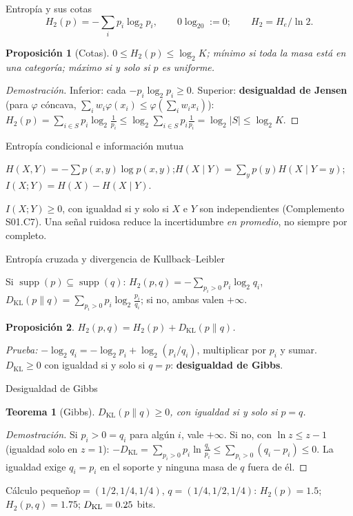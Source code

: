 \documentclass[aspectratio=169,10pt]{beamer}
\newtheorem{proposicion}{Proposición}
\newtheorem{teorema}{Teorema}
\begin{document}
\begin{frame}{Entropía y sus cotas}
\[H_2(p)=-\sum_ip_i\log_2p_i,\qquad 0\log_20:=0;\qquad H_2=H_e/\ln2.\]
\begin{proposicion}[Cotas]
$0\le H_2(p)\le\log_2K$; mínimo si toda la masa está en una categoría; máximo si y solo si $p$ es uniforme.
\end{proposicion}
\begin{proof}[Demostración]\small
Inferior: cada $-p_i\log_2p_i\ge0$. Superior: \textbf{desigualdad de Jensen} (para
$\varphi$ cóncava, $\sum_iw_i\varphi(x_i)\le\varphi(\sum_iw_ix_i)$):
$H_2(p)=\sum_{i\in S}p_i\log_2\frac1{p_i}\le\log_2\sum_{i\in S}p_i\frac1{p_i}=\log_2|S|\le\log_2K$.
\end{proof}
\end{frame}

\begin{frame}{Entropía condicional e información mutua}
\begin{definition}
$H(X,Y)=-\sum p(x,y)\log p(x,y)$;\quad $H(X\mid Y)=\sum_yp(y)H(X\mid Y=y)$;\quad
$I(X;Y)=H(X)-H(X\mid Y)$.
\end{definition}
\small $I(X;Y)\ge0$, con igualdad si y solo si $X$ e $Y$ son independientes (Complemento S01.C7).
Una señal ruidosa reduce la incertidumbre \emph{en promedio}, no siempre por completo.
\end{frame}

\begin{frame}{Entropía cruzada y divergencia de Kullback--Leibler}
\begin{definition}
Si $\operatorname{supp}(p)\subseteq\operatorname{supp}(q)$:
$H_2(p,q)=-\sum_{p_i>0}p_i\log_2q_i$,\quad $D_{\mathrm{KL}}(p\|q)=\sum_{p_i>0}p_i\log_2\frac{p_i}{q_i}$; si no, ambas valen $+\infty$.
\end{definition}
\begin{proposicion}
$H_2(p,q)=H_2(p)+D_{\mathrm{KL}}(p\|q)$.
\end{proposicion}
\small\emph{Prueba:} $-\log_2q_i=-\log_2p_i+\log_2(p_i/q_i)$, multiplicar por $p_i$ y sumar.
$D_{\mathrm{KL}}\ge0$ con igualdad si y solo si $q=p$: \textbf{desigualdad de Gibbs}.
\end{frame}

\begin{frame}{Desigualdad de Gibbs}
\begin{teorema}[Gibbs]
$D_{\mathrm{KL}}(p\|q)\ge0$, con igualdad si y solo si $p=q$.
\end{teorema}
\begin{proof}[Demostración]\small
Si $p_i>0=q_i$ para algún $i$, vale $+\infty$. Si no, con $\ln z\le z-1$ (igualdad solo en $z=1$):
$-D_{\mathrm{KL}}=\sum_{p_i>0}p_i\ln\frac{q_i}{p_i}\le\sum_{p_i>0}(q_i-p_i)\le0$.
La igualdad exige $q_i=p_i$ en el soporte y ninguna masa de $q$ fuera de él.
\end{proof}
\begin{block}{Cálculo pequeño}\centering $p=(1/2,1/4,1/4)$, $q=(1/4,1/2,1/4)$:
$H_2(p)=1.5$; $H_2(p,q)=1.75$; $D_{\rm KL}=0.25$ bits.\end{block}
\end{frame}
\end{document}
